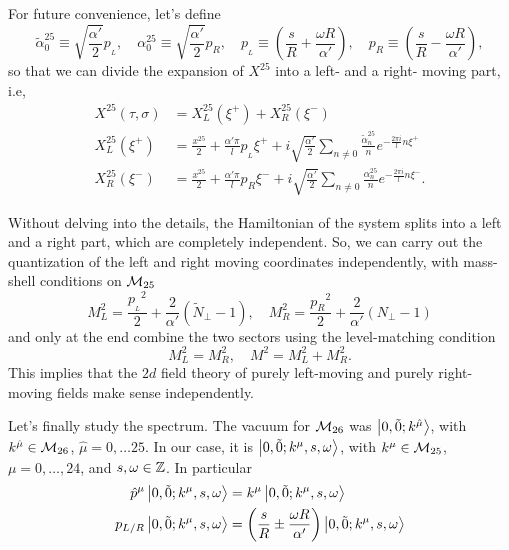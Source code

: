 For future convenience, let's define
\begin{equation}\label{eq:pl-pr-def}
    \tilde{\alpha}^{25}_0 \equiv \sqrt{\frac{\alpha'}{2}} p_{\!_L}, \quad {\alpha}^{25}_0 \equiv \sqrt{\frac{\alpha'}{2}} p_R, \quad p_{\!_L} \equiv \left( \frac{s}{R} + \frac{\omega R}{\alpha'} \right), \quad p_R \equiv \left( \frac{s}{R} - \frac{\omega R}{\alpha'} \right) ,
\end{equation}
so that we can divide the expansion of $X^{25}$ into a left- and a right- moving part, i.e,
\begin{subequations}\label{eq:expansion-x-25}
\begin{align}
    X^{25}(\tau,\sigma) &= X^{25}_L(\xi^+) + X^{25}_R(\xi^-) \\
    X^{25}_L(\xi^+)     &= \frac{x^{25}}{2} + \frac{\alpha' \pi}{l} p_{\!_L} \xi^+ + i \sqrt{\frac{\alpha'}{2}} \sum_{n\neq 0} \frac{\tilde{\alpha}^{25}_n}{n}e^{-\frac{2\pi i}{l}n \xi^+} \\
    X^{25}_R(\xi^-)     &= \frac{x^{25}}{2} + \frac{\alpha' \pi}{l} p_R \xi^- + i \sqrt{\frac{\alpha'}{2}} \sum_{n\neq 0} \frac{{\alpha}^{25}_n}{n}e^{-\frac{2\pi i}{l}n \xi^-}.
\end{align}
\end{subequations}

Without delving into the details, the Hamiltonian of the system splits into a left and a right part, which are completely independent. So, we can carry out the quantization of the left and right moving coordinates independently, with mass-shell conditions on $\mathcal{M}_{25}$
\begin{equation}\label{eq:left-right-mass-shell}
    M^2_L = \frac{{p_{\!_L}}^2}{2} + \frac{2}{\alpha'}(\tilde{N}_\perp-1), \quad M^2_R = \frac{{p_R}^2}{2} + \frac{2}{\alpha'}({N}_\perp-1)
\end{equation}
and only at the end combine the two sectors using the level-matching condition
\begin{equation}
    M^2_L = M^2_R, \quad M^2 = M^2_L + M^2_R .
\end{equation}
This implies that the $2d$ field theory of purely left-moving and purely right-moving fields make sense independently.

Let's finally study the spectrum. The vacuum for $\mathcal{M}_{26}$ was $\ket{0,\tilde{0}; k^{\hat{\mu}}}$, with $k^{\hat{\mu}} \in \mathcal{M}_{26}$, $\hat{\mu} = 0, \dots 25$. In our case, it is $\ket{0,\tilde{0}; k^\mu, s, \omega}$, with $k^\mu \in \mathcal{M}_{25}$, $\mu = 0, \dots, 24$, and $s,\omega \in \mathbb{Z}$. In particular
\begin{equation}
\begin{aligned}
    \hat{p}^\mu \ket{0,\tilde{0}; k^\mu, s, \omega} &= k^\mu \ket{0,\tilde{0}; k^\mu, s, \omega} \\ 
    p_{L/R}\ket{0,\tilde{0}; k^\mu, s, \omega} &= \left( \frac{s}{R} \pm \frac{\omega R}{\alpha'} \right) \ket{0,\tilde{0}; k^\mu, s, \omega}
\end{aligned}
\end{equation}

